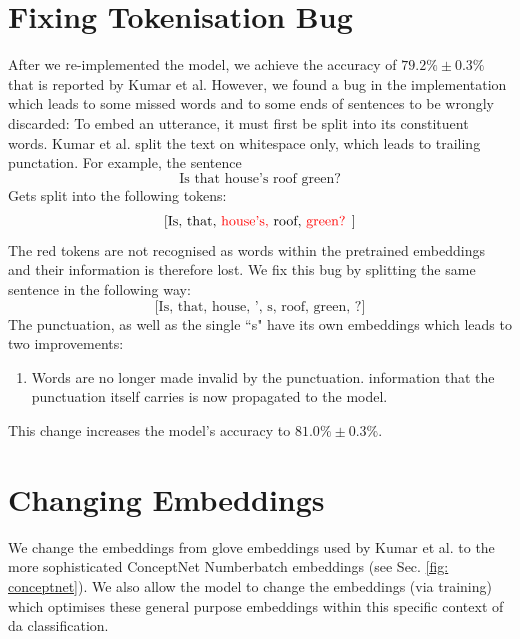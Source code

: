     \section{Fixing Tokenisation Bug}
        After we re-implemented the \gls{model}, we achieve the accuracy of $79.2\% \pm 0.3\%$ that is reported by Kumar et al. However, we found a bug in the implementation which leads to some missed words and to some ends of sentences to be wrongly discarded: To embed an \gls{utterance}, it must first be split into its constituent words. Kumar et al. split the text on whitespace only, which leads to trailing punctation. For example, the sentence
        \begin{equation*}
            \text{Is that house's roof green?}
        \end{equation*}
        Gets split into the following tokens:
        \begin{equation*}
            \text{[Is, that, \color{red} house's, \color{black} roof, \color{red} green? \color{black}]}
        \end{equation*}
        The red tokens are not recognised as words within the pretrained \glspl{embedding} and their information is therefore lost. We fix this bug by splitting the same sentence in the following way:
        \begin{equation*}
            \text{[Is, that, house, ', s, roof, green, ?]}
        \end{equation*}
        The punctuation, as well as the single ``s" have its own \glspl{embedding} which leads to two improvements:
        \begin{enumerate}
            \item Words are no longer made invalid by the punctuation.
            \The information that the punctuation itself carries is now propagated to the \gls{model}.
        \end{enumerate}
        This change increases the \gls{model}'s accuracy to $81.0\% \pm 0.3\%$.
        

    
    \section{Changing Embeddings} 
    We change the \glspl{embedding} from \gls{glove} \glspl{embedding} used by Kumar et al.\cite{kumar2017dialogue} to the more sophisticated ConceptNet Numberbatch \glspl{embedding} (see Sec. \ref{fig: conceptnet}). We also allow the \gls{model} to change the \glspl{embedding} (via training) which optimises these general purpose \glspl{embedding} within this specific context of \gls{da} classification.
    
